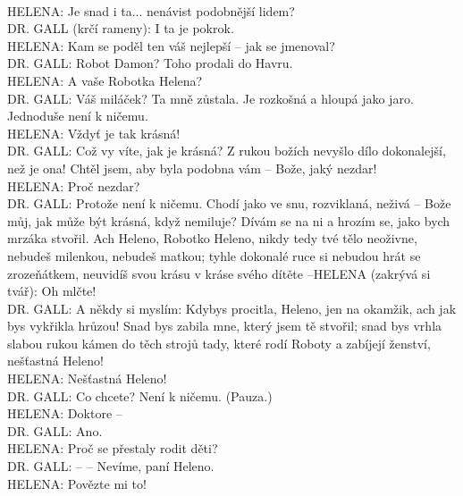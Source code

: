 \documentclass[11pt]{article}
\begin{document}
\\ HELENA: Je snad i ta... nenávist podobnější lidem? \\ DR. GALL (krčí rameny): I ta je pokrok. \\ HELENA: Kam se poděl ten váš nejlepší – jak se jmenoval?\\ DR. GALL: Robot Damon? Toho prodali do Havru. \\ HELENA: A vaše Robotka Helena? \\ DR. GALL: Váš miláček? Ta mně zůstala. Je rozkošná a hloupá jako jaro. Jednoduše není k ničemu. \\ HELENA: Vždyť je tak krásná! \\ DR. GALL: Což vy víte, jak je krásná? Z rukou božích nevyšlo dílo dokonalejší,  než  je  ona!  Chtěl  jsem,  aby  byla  podobna  vám  – Bože, jaký nezdar! \\ HELENA: Proč nezdar? \\ DR.  GALL:  Protože  není  k  ničemu.  Chodí  jako  ve  snu, rozviklaná, neživá – Bože můj, jak může být krásná, když nemiluje? Dívám se na ni a hrozím se, jako bych mrzáka stvořil. Ach Heleno, Robotko Heleno,  nikdy  tedy  tvé  tělo  neoživne,  nebudeš  milenkou, nebudeš  matkou;  tyhle  dokonalé  ruce  si  nebudou  hrát  se zrozeňátkem, neuvidíš svou krásu v kráse svého dítěte –HELENA (zakrývá si tvář): Oh mlčte! \\ DR.  GALL:  A  někdy  si  myslím:  Kdybys  procitla,  Heleno,  jen  na okamžik, ach jak bys vykřikla hrůzou! Snad bys zabila mne, který jsem tě stvořil; snad bys vrhla slabou rukou kámen do těch strojů tady, které rodí Roboty a zabíjejí ženství, nešťastná Heleno! \\ HELENA: Nešťastná Heleno! \\ DR. GALL: Co chcete? Není k ničemu. (Pauza.) \\ HELENA: Doktore – \\ DR. GALL: Ano. \\ HELENA: Proč se přestaly rodit děti? \\ DR. GALL: – – Nevíme, paní Heleno. \\ HELENA: Povězte mi to! 
\end{document}
